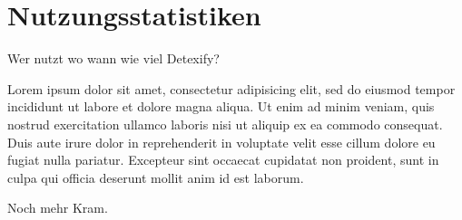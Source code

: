 \chapter{Nutzungsstatistiken} %
\label{cha:nutzungsstatistiken}

\TODO Wer nutzt wo wann wie viel Detexify?

Lorem ipsum dolor sit amet, consectetur adipisicing elit, sed do eiusmod tempor incididunt ut labore et dolore magna aliqua. Ut enim ad minim veniam, quis nostrud exercitation ullamco laboris nisi ut aliquip ex ea commodo consequat. Duis aute irure dolor in reprehenderit in voluptate velit esse cillum dolore eu fugiat nulla pariatur. Excepteur sint occaecat cupidatat non proident, sunt in culpa qui officia deserunt mollit anim id est laborum.

Noch mehr Kram.

